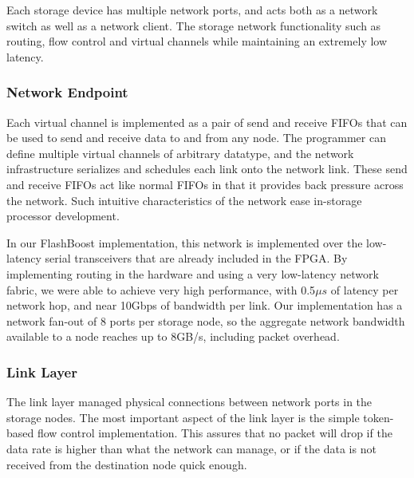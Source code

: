 Each storage device has multiple network ports, and
acts both as a network switch as well as a network client. The storage network
functionality such as routing, flow control and virtual channels while
maintaining an extremely low latency.

\subsubsection{Network Endpoint}

Each virtual channel is implemented as a pair of send and receive FIFOs that can
be used to send and receive data to and from any node. The programmer can define
multiple virtual channels of arbitrary datatype, and the network infrastructure
serializes and schedules each link onto the network link. These send and receive
FIFOs act like normal FIFOs in that it provides back pressure across the
network. Such intuitive characteristics of the network ease in-storage processor
development.

In our FlashBoost implementation, this network is implemented over the
low-latency serial transceivers that are already included in the FPGA. By
implementing routing in the hardware and using a very low-latency network
fabric, we were able to achieve very high performance, with 0.5$\mu s$ of
latency per network hop, and near 10Gbps of bandwidth per link. Our
implementation has a network fan-out of 8 ports per storage node, so the
aggregate network bandwidth available to a node reaches up to 8GB/s, including
packet overhead.

\subsubsection{Link Layer}

The link layer managed physical connections between network ports in the storage
nodes. The most important aspect of the link layer is the simple token-based
flow control implementation. This assures that no packet will drop if the data
rate is higher than what the network can manage, or if the data is not received
from the destination node quick enough.

